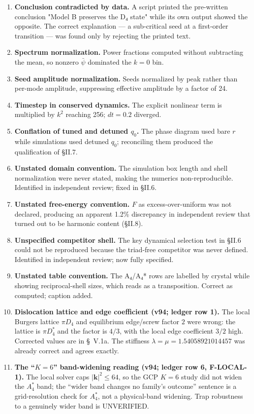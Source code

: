 \documentclass[a4paper,11pt]{article}
\begin{document}
\begin{enumerate}
\item \textbf{Conclusion contradicted by data.} A script printed the pre-written conclusion "Model B preserves the D₄ state" while its own output showed the opposite. The correct explanation — a sub-critical seed at a first-order transition — was found only by rejecting the printed text.
\item \textbf{Spectrum normalization.} Power fractions computed without subtracting the mean, so nonzero $\bar\psi$ dominated the $k=0$ bin.
\item \textbf{Seed amplitude normalization.} Seeds normalized by peak rather than per-mode amplitude, suppressing effective amplitude by a factor of 24.
\item \textbf{Timestep in conserved dynamics.} The explicit nonlinear term is multiplied by $k^2$ reaching 256; $dt=0.2$ diverged.
\item \textbf{Conflation of tuned and detuned $q_0$.} The phase diagram used bare $r$ while simulations used detuned $q_0$; reconciling them produced the qualification of §II.7.
\item \textbf{Unstated domain convention.} The simulation box length and shell normalization were never stated, making the numerics non-reproducible. Identified in independent review; fixed in §II.6.
\item \textbf{Unstated free-energy convention.} $F$ as excess-over-uniform was not declared, producing an apparent 1.2\% discrepancy in independent review that turned out to be harmonic content (§II.8).
\item \textbf{Unspecified competitor shell.} The key dynamical selection test in §II.6 could not be reproduced because the triad-free competitor was never defined. Identified in independent review; now fully specified.
\item \textbf{Unstated table convention.} The A₄/A₄* rows are labelled by crystal while showing reciprocal-shell sizes, which reads as a transposition. Correct as computed; caption added.
\item \textbf{Dislocation lattice and edge coefficient (v94; ledger row 1).} The local Burgers lattice $\pi D_4$ and equilibrium edge/screw factor $2$ were wrong: the lattice is $\pi D_4^*$ and the factor is $4/3$, with the local edge coefficient $3/2$ high. Corrected values are in \S~V.1a. The stiffness $\lambda=\mu=1.54058921014457$ was already correct and agrees exactly.
\item \textbf{The ``$K=6$'' band-widening reading (v94; ledger row 6, F-LOCAL-1).} The local solver caps $|\mathbf{k}|^2\leq64$, so the GCP $K=6$ study did not widen the $A_4^*$ band; the ``wider band changes no family's outcome'' sentence is a grid-resolution check for $A_4^*$, not a physical-band widening. Trap robustness to a genuinely wider band is UNVERIFIED.
\end{enumerate}
\end{document}
